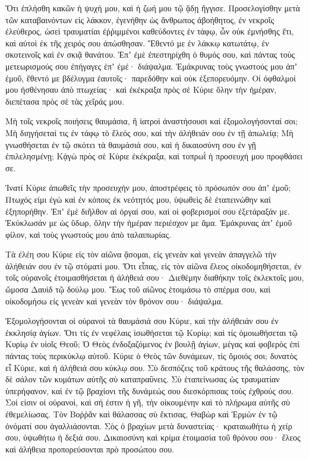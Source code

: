 \begin{spacing}{1.1}
\begin{multicols}{2}
Ὅτι ἐπλήσθη κακῶν ἡ ψυχή μου, καὶ ἡ ζωή μου τῷ ᾅδῃ ἤγγισε.
Προσελογίσθην μετὰ τῶν καταβαινόντων εἰς λάκκον, ἐγενήθην ὡς ἄνθρωπος ἀβοήθητος,
ἐν νεκροῖς ἐλεύθερος, ὡσεὶ τραυματίαι ἐῤῥιμμένοι καθεύδοντες ἐν τάφῳ, ὧν οὐκ ἐμνήσθης ἔτι, καὶ αὐτοὶ ἐκ τῆς χειρός σου ἀπώσθησαν.
Ἔθεντό με ἐν λάκκῳ κατωτάτῳ, ἐν σκοτεινοῖς καὶ ἐν σκιᾷ θανάτου.
Ἐπʼ ἐμὲ ἐπεστηρίχθη ὁ θυμός σου, καὶ πάντας τοὺς μετεωρισμούς σου ἐπήγαγες ἐπʼ ἐμέ· διάψαλμα.
Ἐμάκρυνας τοὺς γνωστούς μου ἀπʼ ἐμοῦ, ἔθεντό με βδέλυγμα ἑαυτοῖς· παρεδόθην καὶ οὐκ ἐξεπορευόμην.
Οἱ ὀφθαλμοί μου ἠσθένησαυ ἀπὸ πτωχείας· καὶ ἐκέκραξα πρὸς σὲ Κύριε ὅλην τὴν ἡμέραν, διεπέτασα πρὸς σὲ τὰς χεῖράς μου.

Μὴ τοῖς νεκροῖς ποιήσεις θαυμάσια, ἢ ἰατροὶ ἀναστήσουσι καὶ ἐξομολογήσονταί σοι;
Μὴ διηγήσεταί τις ἐν τάφῳ τὸ ἔλεός σου, καὶ τὴν ἀλήθειάν σου ἐν τῇ ἀπωλείᾳ;
Μὴ γνωσθήσεται ἐν τῷ σκότει τὰ θαυμάσιά σου, καὶ ἡ δικαιοσύνη σου ἐν γῇ ἐπιλελησμένῃ;
Κᾀγὼ πρὸς σὲ Κύριε ἐκέκραξα, καὶ τοπρωῒ ἡ προσευχή μου προφθάσει σε.

Ἱνατί Κύριε ἀπωθεῖς τὴν προσευχήν μου, ἀποστρέφεις τὸ πρόσωπόν σου ἀπʼ ἐμοῦ;
Πτωχός εἰμι ἐγὼ καὶ ἐν κόποις ἐκ νεότητός μου, ὑψωθεὶς δὲ ἐταπεινώθην καὶ ἐξηπορήθην.
Ἐπʼ ἐμὲ διῆλθον αἱ ὀργαί σου, καὶ οἱ φοβερισμοί σου ἐξετάραξάν με.
Ἐκύκλωσάν με ὡς ὕδωρ, ὅλην τὴν ἡμέραν περιέσχον με ἅμα.
Ἐμάκρυνας ἀπʼ ἐμοῦ φίλον, καὶ τοὺς γνωστούς μου ἀπὸ ταλαιπωρίας.

Τὰ ἐλέη σου Κύριε εἰς τὸν αἰῶνα ᾄσομαι, εἰς γενεὰν καὶ γενεὰν ἀπαγγελῶ τὴν ἀλήθειάν σου ἐν τῷ στόματί μου.
Ὅτι εἶπας, εἰς τὸν αἰῶνα ἔλεος οἰκοδομηθήσεται, ἐν τοῖς οὐρανοῖς ἑτοιμασθήσεται ἡ ἀλήθειά σου·
Διεθέμην διαθήκην τοῖς ἐκλεκτοῖς μου, ὤμοσα Δαυὶδ τῷ δούλῳ μου.
Ἕως τοῦ αἰῶνος ἑτοιμάσω τὸ σπέρμα σου, καὶ οἰκοδομήσω εἰς γενεὰν καὶ γενεὰν τὸν θρόνον σου· διάψαλμα.

Ἐξομολογήσονται οἱ οὐρανοὶ τὰ θαυμάσιά σου Κύριε, καὶ τὴν ἀλήθειάν σου ἐν ἐκκλησίᾳ ἁγίων.
Ὅτι τίς ἐν νεφέλαις ἰσωθήσεται τῷ Κυρίῳ; καὶ τίς ὁμοιωθήσεται τῷ Κυρίῳ ἐν υἱοῖς Θεοῦ;
Ὁ Θεὸς ἐνδοξαζόμενος ἐν βουλῇ ἁγίων, μέγας καὶ φοβερὸς ἐπὶ πάντας τοὺς περικύκλῳ αὐτοῦ.
Κύριε ὁ Θεὸς τῶν δυνάμεων, τίς ὅμοιός σοι; δυνατὸς εἶ Κύριε, καὶ ἡ ἀλήθειά σου κύκλῳ σου.
Σὺ δεσπόζεις τοῦ κράτους τῆς θαλάσσης, τὸν δὲ σάλον τῶν κυμάτων αὐτῆς σὺ καταπραΰνεις.
Σὺ ἐταπείνωσας ὡς τραυματίαν ὑπερήφανον, καὶ ἐν τῷ βραχίονι τῆς δυνάμεώς σου διεσκόρπισας τοὺς ἐχθρούς σου.
Σοί εἰσιν οἱ οὐρανοὶ, καὶ σή ἐστιν ἡ γῆ, τὴν οἰκουμένην καὶ τὸ πλήρωμα αὐτῆς σὺ ἐθεμελίωσας.
Τὸν Βοῤῥᾶν καὶ θάλασσας σὺ ἔκτισας, Θαβὼρ καὶ Ἑρμὼν ἐν τῷ ὀνόματί σου ἀγαλλιάσονται.
Σὸς ὁ βραχίων μετὰ δυναστείας· κραταιωθήτω ἡ χείρ σου, ὑψωθήτω ἡ δεξιά σου.
Δικαιοσύνη καὶ κρίμα ἑτοιμασία τοῦ θρόνου σου· ἔλεος καὶ ἀλήθεια προπορεύσονται πρὸ προσώπου σου.


\end{multicols}
\end{spacing}
